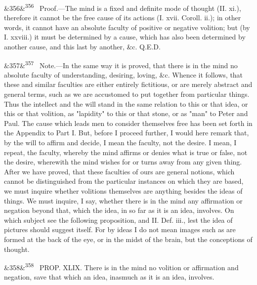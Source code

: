 \documentclass[12pt]{article}
\newcommand{\para}[1][]{\par\noindent\ifx&#1&\else\textsuperscript{\footnotesize #1}~\fi}
\begin{document}
\para[356] Proof.---The mind is a fixed and definite mode of thought (II. xi.), therefore it cannot be the free cause of its actions (I. xvii. Coroll. ii.); in other words, it cannot have an absolute faculty of positive or negative volition; but (by I. xxviii.) it must be determined by a cause, which has also been determined by another cause, and this last by another, \&c. Q.E.D.

\para[357] Note.---In the same way it is proved, that there is in the mind no absolute faculty of understanding, desiring, loving, \&c. Whence it follows, that these and similar faculties are either entirely fictitious, or are merely abstract and general terms, such as we are accustomed to put together from particular things. Thus the intellect and the will stand in the same relation to this or that idea, or this or that volition, as "lapidity" to this or that stone, or as "man" to Peter and Paul. The cause which leads men to consider themselves free has been set forth in the Appendix to Part I. But, before I proceed further, I would here remark that, by the will to affirm and decide, I mean the faculty, not the desire. I mean, I repeat, the faculty, whereby the mind affirms or denies what is true or false, not the desire, wherewith the mind wishes for or turns away from any given thing. After we have proved, that these faculties of ours are general notions, which cannot be distinguished from the particular instances on which they are based, we must inquire whether volitions themselves are anything besides the ideas of things. We must inquire, I say, whether there is in the mind any affirmation or negation beyond that, which the idea, in so far as it is an idea, involves. On which subject see the following proposition, and II. Def. iii., lest the idea of pictures should suggest itself. For by ideas I do not mean images such as are formed at the back of the eye, or in the midst of the brain, but the conceptions of thought.

\para[358] PROP. XLIX. There is in the mind no volition or affirmation and negation, save that which an idea, inasmuch as it is an idea, involves.
\end{document}
